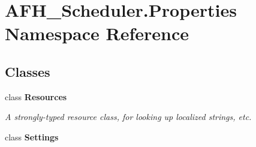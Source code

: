 \section{A\+F\+H\+\_\+\+Scheduler.\+Properties Namespace Reference}
\label{namespace_a_f_h___scheduler_1_1_properties}
\subsection*{Classes}
\begin{DoxyCompactItemize}
\item 
class \textbf{ Resources}
\begin{DoxyCompactList}\small\item\em A strongly-\/typed resource class, for looking up localized strings, etc. \end{DoxyCompactList}\item 
class \textbf{ Settings}
\end{DoxyCompactItemize}
